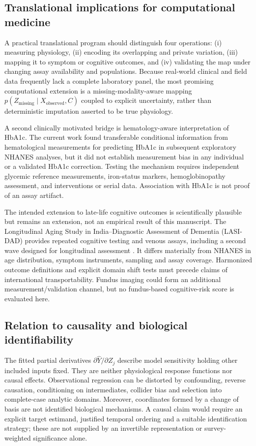 \documentclass[11pt,a4paper]{article}
\begin{document}
\subsection{Translational implications for computational medicine}
A practical translational program should distinguish four operations: (i) measuring physiology, (ii) encoding its overlapping and private variation, (iii) mapping it to symptom or cognitive outcomes, and (iv) validating the map under changing assay availability and populations. Because real-world clinical and field data frequently lack a complete laboratory panel, the most promising computational extension is a missing-modality-aware mapping $p(Z_{\mathrm{missing}}\mid X_{\mathrm{observed}},C)$ coupled to explicit uncertainty, rather than deterministic imputation asserted to be true physiology.

A second clinically motivated bridge is hematology-aware interpretation of HbA1c. The current work found transferable conditional information from hematological measurements for predicting HbA1c in subsequent exploratory NHANES analyses, but it did not establish measurement bias in any individual or a validated HbA1c correction. Testing the mechanism requires independent glycemic reference measurements, iron-status markers, hemoglobinopathy assessment, and interventions or serial data. Association with HbA1c is not proof of an assay artifact.

The intended extension to late-life cognitive outcomes is scientifically plausible but remains an extension, not an empirical result of this manuscript. The Longitudinal Aging Study in India--Diagnostic Assessment of Dementia (LASI-DAD) provides repeated cognitive testing and venous assays, including a second wave designed for longitudinal assessment \cite{lasi2020,lasiwave2}. It differs materially from NHANES in age distribution, symptom instruments, sampling and assay coverage. Harmonized outcome definitions and explicit domain shift tests must precede claims of international transportability. Fundus imaging could form an additional measurement/validation channel, but no fundus-based cognitive-risk score is evaluated here.

\subsection{Relation to causality and biological identifiability}
The fitted partial derivatives $\partial\widehat{Y}/\partial Z_j$ describe model sensitivity holding other included inputs fixed. They are neither physiological response functions nor causal effects. Observational regression can be distorted by confounding, reverse causation, conditioning on intermediates, collider bias and selection into complete-case analytic domains. Moreover, coordinates formed by a change of basis are not identified biological mechanisms. A causal claim would require an explicit target estimand, justified temporal ordering and a suitable identification strategy; these are not supplied by an invertible representation or survey-weighted significance alone.
\end{document}
